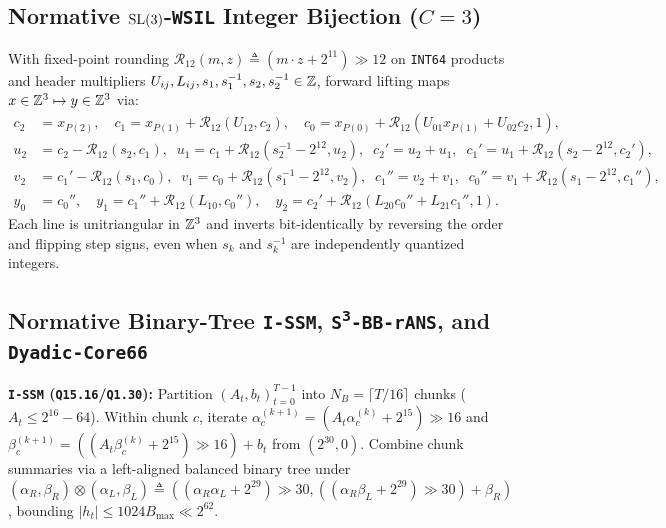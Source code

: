 \subsection{Normative \texorpdfstring{$\mathrm{SL}(3)$}{SL(3)}-\texttt{WSIL} Integer Bijection (\texorpdfstring{$C = 3$}{C = 3})}
With fixed-point rounding $\mathcal{R}_{12}(m, z) \triangleq (m\cdot z + 2^{11}) \gg 12$ on \texttt{INT64} products and header multipliers $U_{ij}, L_{ij}, s_1, s_1^{-1}, s_2, s_2^{-1} \in \mathbb{Z}$, forward lifting maps $x \in \mathbb{Z}^3 \mapsto y \in \mathbb{Z}^3$ via:
\begin{align}
  c_2 &= x_{P(2)}, \quad c_1 = x_{P(1)} + \mathcal{R}_{12}(U_{12}, c_2), \quad c_0 = x_{P(0)} + \mathcal{R}_{12}(U_{01} x_{P(1)} + U_{02} c_2, 1), \\
  u_2 &= c_2 - \mathcal{R}_{12}(s_2, c_1), \;\; u_1 = c_1 + \mathcal{R}_{12}(s_2^{-1}\! - 2^{12}, u_2), \;\; c_2' = u_2 + u_1, \;\; c_1' = u_1 + \mathcal{R}_{12}(s_2 - 2^{12}, c_2'), \\
  v_2 &= c_1' - \mathcal{R}_{12}(s_1, c_0), \;\; v_1 = c_0 + \mathcal{R}_{12}(s_1^{-1}\! - 2^{12}, v_2), \;\; c_1'' = v_2 + v_1, \;\; c_0'' = v_1 + \mathcal{R}_{12}(s_1 - 2^{12}, c_1''), \\
  y_0 &= c_0'', \quad y_1 = c_1'' + \mathcal{R}_{12}(L_{10}, c_0''), \quad y_2 = c_2' + \mathcal{R}_{12}(L_{20} c_0'' + L_{21} c_1'', 1).
\end{align}
Each line is unitriangular in $\mathbb{Z}^3$ and inverts bit-identically by reversing the order and flipping step signs, even when $s_k$ and $s_k^{-1}$ are independently quantized integers.

\subsection{Normative Binary-Tree \texttt{I-SSM}, \texorpdfstring{\texttt{S\textsuperscript{3}-BB-rANS}}{S3-BB-rANS}, and \texttt{Dyadic-Core66}}
\textbf{\texttt{I-SSM} (\texttt{Q15.16}/\texttt{Q1.30}):} Partition $(A_t, b_t)_{t=0}^{T-1}$ into $N_B = \lceil T/16\rceil$ chunks ($A_t \le 2^{16}-64$). Within chunk $c$, iterate $\alpha_c^{(k+1)} = (A_t \alpha_c^{(k)} + 2^{15})\gg 16$ and $\beta_c^{(k+1)} = ((A_t \beta_c^{(k)} + 2^{15})\gg 16) + b_t$ from $(2^{30},0)$. Combine chunk summaries via a left-aligned balanced binary tree under $(\alpha_R,\beta_R)\otimes(\alpha_L,\beta_L) \triangleq ((\alpha_R\alpha_L+2^{29})\gg 30, ((\alpha_R\beta_L+2^{29})\gg 30)+\beta_R)$, bounding $|h_t| \le 1024 B_{\max} \ll 2^{62}$.

